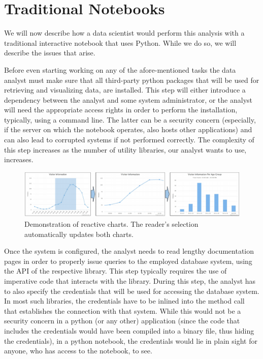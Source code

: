 \section{Traditional Notebooks}



We will now describe how a data scientist would perform this analysis with a traditional interactive notebook that uses Python. While we do so, we will describe the issues that arise.

 Before even starting working on any of the afore-mentioned tasks the data analyst must make sure that all third-party python packages that will be used for retrieving and visualizing data, are installed. This step will either introduce a dependency between the analyst and some system administrator, or the analyst will need the appropriate access rights in order to perform the installation, typically, using a command line. The latter can be a security concern (especially, if the server on which the notebook operates, also hosts other applications) and can also lead to corrupted systems if not performed correctly. The complexity of this step increases as the number of utility libraries, our analyst wants to use, increases. 

\begin{figure}[hbt!]
\centering
	\includegraphics[width=1\textwidth]{figures/reactive-processing2.pdf}
	\caption{Demonstration of reactive charts. The reader's selection automatically updates both charts.}
	\label{fig:reactive-data-processing}
\end{figure}


Once the system is configured, the analyst needs to read lengthy documentation pages in order to properly issue queries to the employed database system, using the API of the respective library. This step typically requires the use of imperative code that interacts with the library. During this step, the analyst has to also specify the credentials that will be used for accessing the database system. In most such libraries, the credentials have to be inlined into the method call that establishes the connection with that system. While this would not be a security concern in a python (or any other) application (since the code that includes the credentials would have been compiled into a binary file, thus hiding the credentials), in a python notebook, the credentials would lie in plain sight for anyone, who has access to the notebook, to see.


